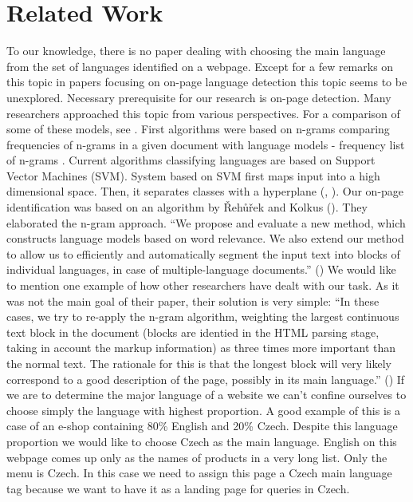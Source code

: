 \documentclass{acm_proc_article-sp}
\begin{document}
\section{Related Work}

  To our knowledge, there is no paper dealing with choosing the main language from the set
  of languages identified on a webpage. Except for a few remarks on this topic in papers 
  focusing on on-page language detection this topic seems to be unexplored. 
  Necessary prerequisite for our research is on-page detection. Many researchers approached this topic
  from various perspectives. For a comparison of some of these models, see \cite{Baldwin:shortlong}. 
  First algorithms were based on n-grams comparing frequencies of n-grams in a given document with 
  language models - frequency list of n-grams \cite{trenkle:ngram}. Current algorithms classifying languages 
  are based on Support Vector Machines (SVM). System based on SVM first maps input into a high dimensional space. 
  Then, it separates classes with a hyperplane (\cite{Campbell:supportvector}, \cite{Lodhi:textclass}).
  Our on-page identification was based on an algorithm by Řehůřek and Kolkus (\cite{Rehurek:languageidentification}).  They elaborated the n-gram approach. 
  “We propose and evaluate a new method, which constructs language models based on word relevance. We also 
  extend our method to allow us to efficiently and automatically segment the input text into blocks of individual 
  languages, in case of multiple-language documents.” (\cite{Rehurek:languageidentification})
  We would like to mention one example of how other researchers have dealt with our task. As it was not the main goal of 
  their paper, their solution is very simple:
  “In these cases, we try to re-apply the n-gram algorithm, weighting the largest continuous text block in the document 
  (blocks are identied in the HTML parsing stage, taking in account the markup information) as three times more important 
  than the normal text. The rationale for this is that the longest block will very likely correspond to a good description 
  of the page, possibly in its main language.” (\cite{Martins:langidentweb}) If we are to determine the major language of a website 
  we can’t confine ourselves to choose simply the language with highest proportion. A good example of this is a case of an e-shop 
  containing 80\% English and 20\% Czech. Despite this language proportion we would like to choose Czech as the main language. 
  English on this webpage comes up only as the names of products in a very long list. Only the menu is Czech. In this case 
  we need to assign this page a Czech main language tag because we want to have it as a landing page for queries in Czech.
\end{document}
